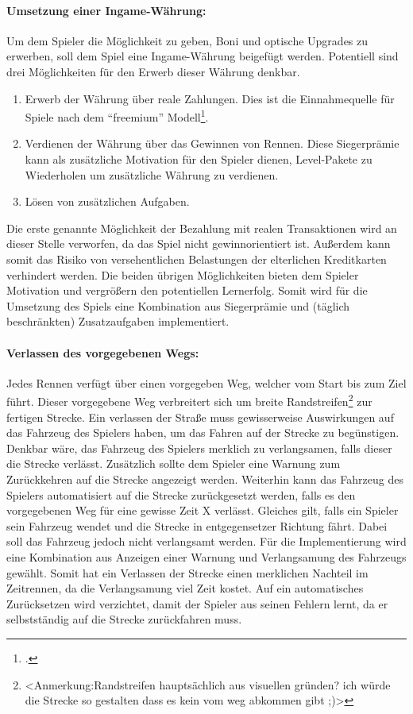 		\paragraph{Umsetzung einer Ingame-Währung:}
		Um dem Spieler die Möglichkeit zu geben, Boni und optische Upgrades zu erwerben, soll dem Spiel eine Ingame-Währung beigefügt werden. Potentiell sind drei Möglichkeiten für den Erwerb dieser Währung denkbar.
		\begin{enumerate}
			\item{ Erwerb der Währung über reale Zahlungen. Dies ist die Einnahmequelle für Spiele nach dem \enquote{freemium} Modell\footcite[Seite 8]{freemium}. }
			\item{ Verdienen der Währung über das Gewinnen von Rennen. Diese Siegerprämie kann als zusätzliche Motivation für den Spieler dienen, Level-Pakete zu Wiederholen um zusätzliche Währung zu verdienen. }
			\item{ Lösen von zusätzlichen Aufgaben. }
		\end{enumerate}
		Die erste genannte Möglichkeit der Bezahlung mit realen Transaktionen wird an dieser Stelle verworfen, da das Spiel nicht gewinnorientiert ist. Außerdem kann somit das Risiko von versehentlichen Belastungen der elterlichen Kreditkarten verhindert werden.
		Die beiden übrigen Möglichkeiten bieten dem Spieler Motivation und vergrößern den potentiellen Lernerfolg. Somit wird für die Umsetzung des Spiels eine Kombination aus Siegerprämie und (täglich beschränkten) Zusatzaufgaben implementiert.

		\paragraph{Verlassen des vorgegebenen Wegs:}
		Jedes Rennen verfügt über einen vorgegeben Weg, welcher vom Start bis zum Ziel führt. Dieser vorgegebene Weg verbreitert sich um breite Randstreifen\footnote{<Anmerkung:Randstreifen hauptsächlich aus visuellen gründen? ich würde die Strecke so gestalten dass es kein vom weg abkommen gibt ;)>} zur fertigen Strecke. Ein verlassen der Straße muss gewisserweise Auswirkungen auf das Fahrzeug des Spielers haben, um das Fahren auf der Strecke zu begünstigen. Denkbar wäre, das Fahrzeug des Spielers merklich zu verlangsamen, falls dieser die Strecke verlässt. Zusätzlich sollte dem Spieler eine Warnung zum Zurückkehren auf die Strecke angezeigt werden. Weiterhin kann das Fahrzeug des Spielers automatisiert auf die Strecke zurückgesetzt werden, falls es den vorgegebenen Weg für eine gewisse Zeit X verlässt. Gleiches gilt, falls ein Spieler sein Fahrzeug wendet und die Strecke in entgegensetzer Richtung fährt. Dabei soll das Fahrzeug jedoch nicht verlangsamt werden. Für die Implementierung wird eine Kombination aus Anzeigen einer Warnung und Verlangsamung des Fahrzeugs gewählt. Somit hat ein Verlassen der Strecke einen merklichen Nachteil im Zeitrennen, da die Verlangsamung viel Zeit kostet. Auf ein automatisches Zurücksetzen wird verzichtet, damit der Spieler aus seinen Fehlern lernt, da er selbstständig auf die Strecke zurückfahren muss.

